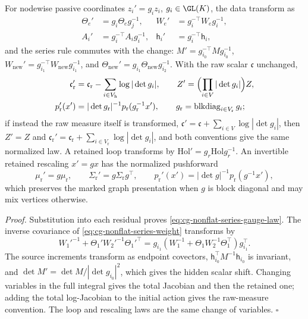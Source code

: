 For nodewise passive coordinates \(z_i'=g_iz_i\), \(g_i\in\GL(K)\), the data
transform as
\begin{equation}
\begin{aligned}
\Theta_e'&=g_i\Theta_eg_j^{-1},&
W_e'&=g_i^{-\top}W_eg_i^{-1},\\
A_i'&=g_i^{-\top}A_ig_i^{-1},&
\mathsf h_i'&=g_i^{-\top}\mathsf h_i,
\end{aligned}
\label{eq:cg-nonflat-series-gauge-law}
\end{equation}
and the series rule commutes with the change:
\(M'=g_{i_0}^{-\top}Mg_{i_0}^{-1}\),
\(W_{\mathrm{new}}'=g_{i_1}^{-\top}W_{\mathrm{new}}g_{i_1}^{-1}\), and
\(\Theta_{\mathrm{new}}'=g_{i_1}\Theta_{\mathrm{new}}g_{i_2}^{-1}\). With the raw
scalar \(\mathfrak c\) unchanged,
\begin{equation}
\begin{aligned}
\mathfrak c_{\mathrm r}'
 &=\mathfrak c_{\mathrm r}-\sum_{i\in V_{\mathrm h}}\log|\det g_i|,\qquad
Z'=\Bigl(\prod_{i\in V}|\det g_i|\Bigr)Z,\\
p_{\mathrm r}'(x')&=|\det g_{\mathrm r}|^{-1}p_{\mathrm r}(g_{\mathrm r}^{-1}x'),
\qquad g_{\mathrm r}=\operatorname{blkdiag}_{i\in V_{\mathrm r}}g_i ;
\end{aligned}
\label{eq:cg-nonflat-series-jacobians}
\end{equation}
if instead the raw measure itself is transformed,
\(\mathfrak c'=\mathfrak c+\sum_{i\in V}\log|\det g_i|\), then \(Z'=Z\) and
\(\mathfrak c_{\mathrm r}'=\mathfrak c_{\mathrm r}+\sum_{i\in V_{\mathrm r}}\log|\det g_i|\),
and both conventions give the same normalized law. A retained loop transforms
by \(\mathrm{Hol}'=g_r\mathrm{Hol}g_r^{-1}\). An invertible retained rescaling
\(x'=gx\) has the normalized pushforward
\begin{equation}
\mu_{\mathrm r}'=g\mu_{\mathrm r},\qquad \Sigma_{\mathrm r}'=g\Sigma_{\mathrm r}g^\top,\qquad
p_{\mathrm r}'(x')=|\det g|^{-1}p_{\mathrm r}(g^{-1}x'),
\label{eq:cg-nonflat-series-rescaling}
\end{equation}
which preserves the marked graph presentation when \(g\) is block diagonal and
may mix vertices otherwise. 

\noindent\emph{Proof.}
Substitution into each residual proves \eqref{eq:cg-nonflat-series-gauge-law}.
The inverse covariance of \eqref{eq:cg-nonflat-series-weight} transforms by
\begin{equation}
W_1'^{-1}+\Theta_1'W_2'^{-1}\Theta_1'^\top
=g_{i_1}(W_1^{-1}+\Theta_1W_2^{-1}\Theta_1^\top)g_{i_1}^\top .
\label{eq:cg-nonflat-series-covariance-gauge}
\end{equation}
The source increments transform as endpoint covectors,
\(\mathsf h_{i_0}^\top M^{-1}\mathsf h_{i_0}\) is invariant, and
\(\det M'=\det M/|\det g_{i_0}|^2\), which gives the hidden scalar shift.
Changing variables in the full integral gives the total Jacobian and then the
retained one; adding the total log-Jacobian to the initial action gives the
raw-measure convention. The loop and rescaling laws are the same change of
variables. \(\square\)

